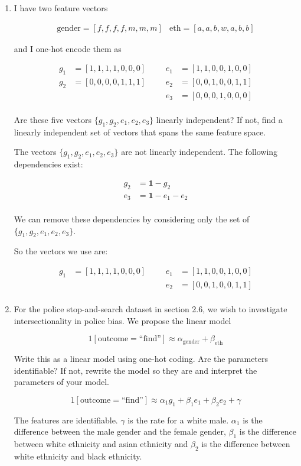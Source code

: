 \documentclass[10pt,\jkfside,a4paper]{article}
\begin{document}
\begin{enumerate}
\item I have two feature vectors

\begin{align*}
\text{gender} = [f, f, f, f, m, m, m] & \text{eth} = [a, a, b, w, a, b, b]
\end{align*}

and I one-hot encode them as

\begin{align*}
g_1 &= [1, 1, 1, 1, 0, 0, 0] & & & e_1 &= [1, 1, 0, 0, 1, 0, 0] \\
g_2 &= [0, 0, 0, 0, 1, 1, 1] & & & e_2 &= [0, 0, 1, 0, 0, 1, 1] \\
	&						 & & & e_3 &= [0, 0, 0, 1, 0, 0, 0] \\
\end{align*}

Are these five vectors $\{g_1, g_2, e_1, e_2, e_3\}$ linearly independent?
If not, find a linearly independent set of vectors that spans the same
feature space.

The vectors $\{g_1, g_2, e_1, e_2, e_3\}$ are not linearly independent. The
following dependencies exist:

\[
\begin{split}
g_2 &= \mathbf{1} - g_2 \\
e_3 &= \mathbf{1} - e_1 - e_2 \\
\end{split}
\]

We can remove these dependencies by considering only the set of
$\{g_1, g_2, e_1, e_2, e_3\}$.

So the vectors we use are:

\begin{align*}
g_1 &= [1, 1, 1, 1, 0, 0, 0] & & & e_1 &= [1, 1, 0, 0, 1, 0, 0] \\
	&						 & & & e_2 &= [0, 0, 1, 0, 0, 1, 1] \\
\end{align*}

\item For the police stop-and-search dataset in section 2.6, we wish to
investigate intersectionality in police bias. We propose the linear model

\[
1[\text{outcome}=\text{``find''}] \approx \alpha_{\text{gender}} +
\beta_{\text{eth}}
\]

Write this as a linear model using one-hot coding. Are the parameters
identifiable? If not, rewrite the model so they are and interpret the
parameters of your model.

\[
1[\text{outcome}=\text{``find''}] \approx \alpha_1 g_1 + \beta_1 e_1 +
\beta_2 e_2 + \gamma
\]

The features are identifiable. $\gamma$ is the rate for a white male.
$\alpha_1$ is the difference between the male gender and the female gender,
$\beta_1$ is the difference between white ethnicity and asian ethnicity and
$\beta_2$ is the difference between white ethnicity and black ethnicity.

\end{enumerate}
\end{document}
